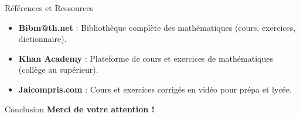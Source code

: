 \documentclass[10pt]{beamer}
\begin{document}
\begin{frame}{Références et Ressources}
    \begin{itemize}
        \item \textbf{Bibm@th.net} : Bibliothèque complète des mathématiques (cours, exercices, dictionnaire).
        \item \textbf{Khan Academy} : Plateforme de cours et exercices de mathématiques (collège au supérieur).
        \item \textbf{Jaicompris.com} : Cours et exercices corrigés en vidéo pour prépa et lycée.
    \end{itemize}
\end{frame}

\begin{frame}{Conclusion}
    \centering
    \textbf{Merci de votre attention !}
\end{frame}
\end{document}
